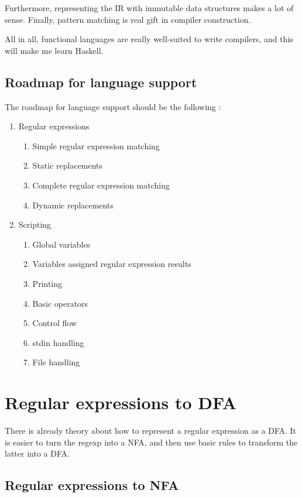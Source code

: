 \documentclass[11pt,a4paper]{report}
\newcommand{\pgl}[1]{\textsf{#1}}
\begin{document}
Furthermore, representing the IR with immutable data structures makes a lot of sense. Finally, pattern matching is real gift in compiler construction.

All in all, functional languages are really well-suited to write compilers, and this will make me learn \pgl{Haskell}.

\section{Roadmap for language support}

The roadmap for language support should be the following :
\begin{enumerate}
\item Regular expressions
	\begin{enumerate}
	\item Simple regular expression matching
	\item Static replacements
	\item Complete regular expression matching
	\item Dynamic replacements	
	\end{enumerate}
\item Scripting
	\begin{enumerate}
	\item Global variables
	\item Variables assigned regular expression results
	\item Printing
	\item Basic operators
	\item Control flow
	\item stdin handling
	\item File handling
	\end{enumerate}
\end{enumerate}

\chapter{Regular expressions to DFA}

There is already theory about how to represent a regular expression as a DFA. It is easier to turn the regexp into a NFA, and then use basic rules to transform the latter into a DFA.

\section{Regular expressions to NFA}
\end{document}
